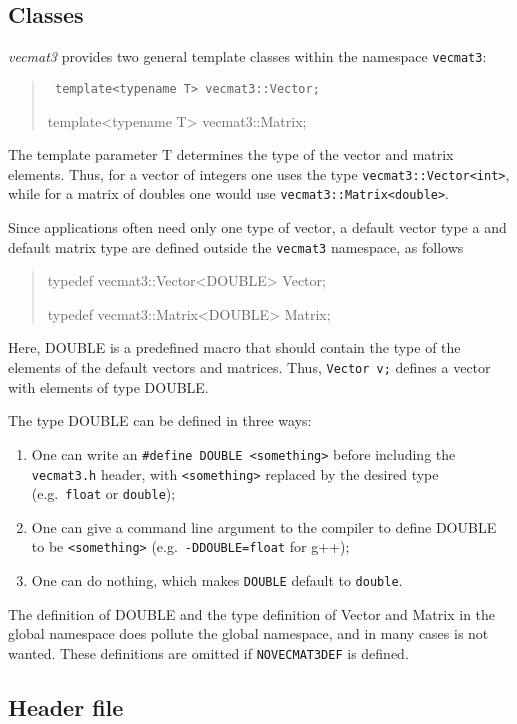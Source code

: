 \documentclass[12pt,twoside]{article}
\begin{document}
\subsection{Classes}

\emph{vecmat3} provides two general template classes within the
namespace \texttt{vecmat3}:

\begin{quote}\tt
  template<typename T> vecmat3::Vector;

  template<typename T> vecmat3::Matrix;
\end{quote}
The template parameter T determines the type of the vector and
matrix elements. Thus, for a vector of integers one uses the type
\texttt{vecmat3::Vector<int>}, while for a matrix of doubles one would
use \texttt{vecmat3::Matrix<double>}.

Since applications often need only one type of vector, a default
vector type a and default matrix type are defined outside the
\texttt{vecmat3} namespace, as follows
\begin{quote}\tt

typedef vecmat3::Vector<DOUBLE> Vector;

typedef vecmat3::Matrix<DOUBLE> Matrix;
\end{quote}
Here, DOUBLE is a predefined macro that should contain the type of the
elements of the default vectors and matrices. Thus, \texttt{Vector v;}
defines a vector with elements of type DOUBLE.

The type DOUBLE can be defined in three ways: 
\begin{enumerate}
\item One can write an
\texttt{\#define DOUBLE <something>} before including the
\texttt{vecmat3.h} header, with \texttt{<something>} replaced by the
desired type (e.g.\ \texttt{float} or \texttt{double});
\item One can give a command line argument to the compiler to define
  DOUBLE to be \texttt{<something>} (e.g.\ \texttt{-DDOUBLE=float} for
  g++);
\item One can do nothing, which makes \texttt{DOUBLE} default to
\texttt{double}.
\end{enumerate}

The definition of DOUBLE and the type definition of Vector and Matrix
in the global namespace does pollute the global namespace, and in many
cases is not wanted. These definitions are omitted if \texttt{NOVECMAT3DEF} is defined.

\subsection{Header file}
\end{document}
